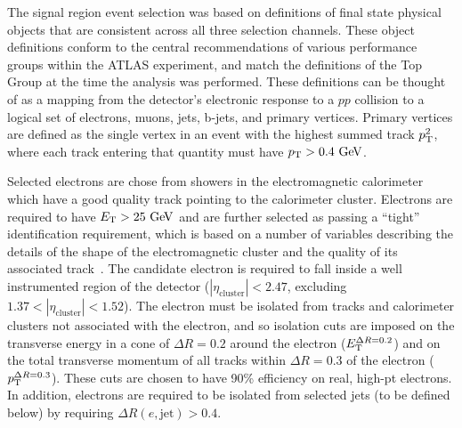 The signal region event selection was based on definitions of final state physical objects that are consistent across all three selection channels.
These object definitions conform to the central recommendations of various performance groups within the ATLAS experiment, and match the definitions of the Top Group at the time the analysis was performed.
These definitions can be thought of as a mapping from the detector's electronic response to a $pp$ collision to a logical set of electrons, muons, jets, b-jets, and primary vertices.
Primary vertices are defined as the single vertex in an event with the highest summed track $p_{\mathrm{T}}^2$, where each track entering that quantity must have $\pT>0.4 \GeV{}$.


Selected electrons are chose from showers in the electromagnetic calorimeter which have a good quality track pointing to the calorimeter cluster.
Electrons are required to have $\ET>25 \GeV$ and are further selected as passing a ``tight'' identification requirement, 
which is based on a number of variables describing the details of the shape of the electromagnetic cluster 
and the quality of its associated track~\cite{ElectronPerformance}.
The candidate electron is required to fall inside a well instrumented region of the detector ($|\eta_\mathrm{cluster}|<2.47$, excluding $1.37<|\eta_\mathrm{cluster}|<1.52$).
The electron must be isolated from tracks and calorimeter clusters not associated with the electron, and so isolation cuts are imposed on the transverse energy in a cone of $\Delta R = 0.2$ around the electron ($E_{\mathrm{T}}^{\Delta R=0.2}$) and on the total transverse momentum of all tracks within $\Delta R = 0.3$ of the electron ($p_{\mathrm{T}}^{\Delta R=0.3}$).
These cuts are chosen to have 90\% efficiency on real, high-pt electrons.
In addition, electrons are required to be isolated from selected jets (to be defined below) by requiring $\Delta R(e,\mathrm{jet})>0.4$. 

